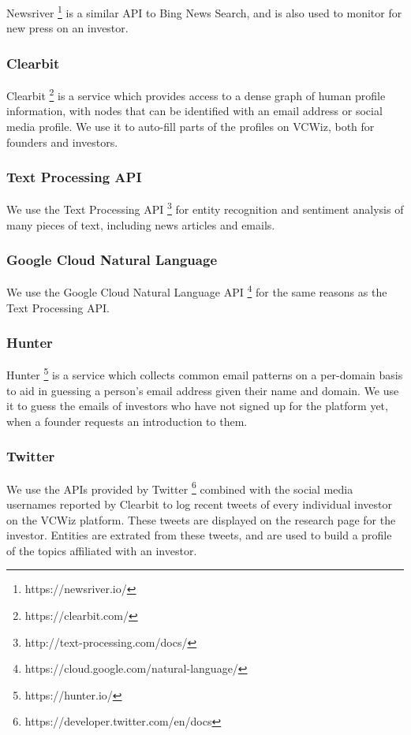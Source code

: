 Newsriver \footnote{https://newsriver.io/} is a similar API to Bing News Search, and is also used to monitor for new press on an investor.

\subsubsection{Clearbit}

Clearbit \footnote{https://clearbit.com/} is a service which provides access to a dense graph of human profile information, with nodes that can be identified with an email address or social media profile. We use it to auto-fill parts of the profiles on VCWiz, both for founders and investors.

\subsubsection{Text Processing API}

We use the Text Processing API \footnote{http://text-processing.com/docs/} for entity recognition and sentiment analysis of many pieces of text, including news articles and emails.

\subsubsection{Google Cloud Natural Language}

We use the Google Cloud Natural Language API \footnote{https://cloud.google.com/natural-language/} for the same reasons as the Text Processing API.

\subsubsection{Hunter}

Hunter \footnote{https://hunter.io/} is a service which collects common email patterns on a per-domain basis to aid in guessing a person's email address given their name and domain. We use it to guess the emails of investors who have not signed up for the platform yet, when a founder requests an introduction to them.

\subsubsection{Twitter}

We use the APIs provided by Twitter \footnote{https://developer.twitter.com/en/docs} combined with the social media usernames reported by Clearbit to log recent tweets of every individual investor on the VCWiz platform. These tweets are displayed on the research page for the investor. Entities are extrated from these tweets, and are used to build a profile of the topics affiliated with an investor.

